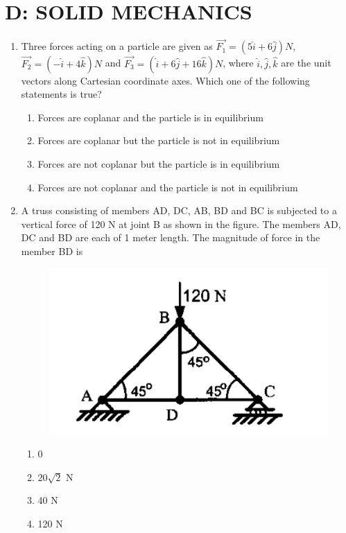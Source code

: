 \documentclass[a4paper,10pt]{article}
\begin{document}
\section*{D: SOLID MECHANICS}
\begin{enumerate}
\item Three forces acting on a particle are given as
$\vec{F_1} = (5\hat{i}+6\hat{j})N$, $\vec{F_2} = (-\hat{i} +4\hat{k})N$ and $\vec{F_3} = (\hat{i}+6\hat{j}+16\hat{k})N$, where $\hat{i}, \hat{j}, \hat{k}$ are the unit vectors along Cartesian coordinate axes. Which one of the following statements is true?
\hfill{}

\begin{enumerate}
\item Forces are coplanar and the particle is in equilibrium
\item Forces are coplanar but the particle is not in equilibrium
\item Forces are not coplanar but the particle is in equilibrium
\item Forces are not coplanar and the particle is not in equilibrium
\end{enumerate}

\item A truss consisting of members AD, DC, AB, BD and BC is subjected to a vertical force of 120 N at joint B as shown in the figure. The members AD, DC and BD are each of 1 meter length. The magnitude of force in the member BD is
\begin{figure}[H]
    \centering
    \includegraphics[width=0.4\columnwidth]{Dq2.png}
    \caption*{}
    \label{fig:q2_solid}
\end{figure}
\hfill{}

\begin{multicols}{4}
\begin{enumerate}
\item 0
\item $20\sqrt{2}$ N
\item 40 N
\item 120 N
\end{enumerate}
\end{multicols}


\end{enumerate}
\end{document}
